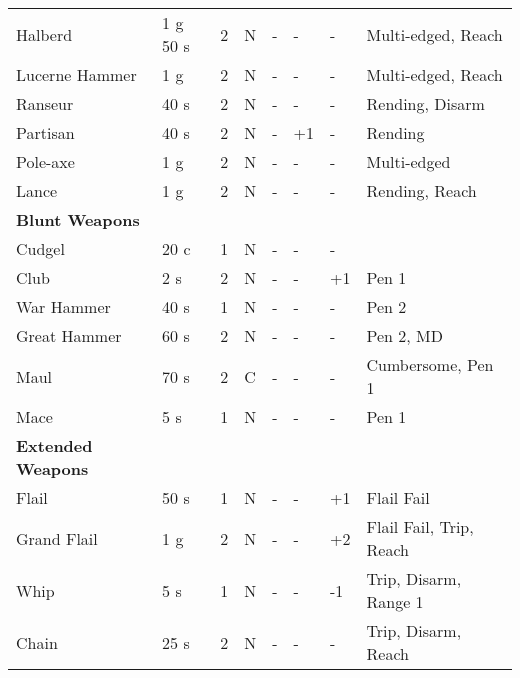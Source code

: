 \documentclass[a4paper,11pt,oneside]{book}
\begin{document}
\begin{table}[ht!]
\begin{tabular}{|l|l|l|l|l|l|l|l|}
		Halberd & 1 g 50 s & 2 & N & - & - & - & Multi-edged, Reach\\
		Lucerne Hammer & 1 g & 2 & N & - & - & - & Multi-edged, Reach\\ 
		Ranseur & 40 s & 2 & N & - & - & - & Rending, Disarm \\ 
		Partisan & 40 s & 2 & N & - & +1 & - & Rending\\
		Pole-axe & 1 g & 2 & N & - & - & - & Multi-edged \\
		Lance & 1 g & 2 & N & - & - & - & Rending, Reach\\
		\hline
		\textbf{Blunt Weapons} & & & & & & & \\
		\hline
		Cudgel & 20 c & 1  & N & - & - & - &  \\
		Club & 2 s & 2 & N & - & - & +1 & Pen 1 \\
		War Hammer & 40 s & 1 & N & - & - & - & Pen 2 \\ 
		Great Hammer & 60 s & 2 & N & - & - & - & Pen 2, MD \\
		Maul & 70 s & 2 & C & - & - & - & Cumbersome, Pen 1 \\
		Mace & 5 s & 1 & N & - & - & - & Pen 1 \\
		\hline
		\textbf{Extended Weapons} & & & & & & & \\
		\hline
		Flail & 50 s & 1 & N & - & - & +1 & Flail Fail \\ 
		Grand Flail & 1 g & 2 & N & - & - & +2 & Flail Fail, Trip, Reach \\
		Whip & 5 s & 1 & N & - & - & -1 & Trip, Disarm, Range 1\\
		Chain & 25 s & 2 & N & - & - & - & Trip, Disarm, Reach\\  
		\hline
	\end{tabular}
\end{table}
\end{document}
